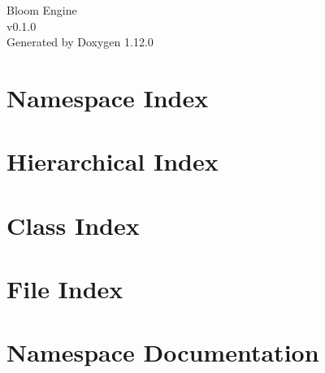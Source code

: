 \documentclass[twoside]{book}
\newcommand{\+}{\discretionary{\mbox{\scriptsize$\hookleftarrow$}}{}{}}
\newcommand{\clearemptydoublepage}{%
    \newpage{\pagestyle{empty}\cleardoublepage}%
  }
\begin{document}
  \raggedbottom
    \hypersetup{pageanchor=false,
                bookmarksnumbered=true,
                pdfencoding=unicode
               }
  \begin{titlepage}
  \vspace*{7cm}
  \begin{center}%
  {\Large Bloom Engine}\\
  [1ex]\large v0.\+1.\+0 \\
  \vspace*{1cm}
  {\large Generated by Doxygen 1.12.0}\\
  \end{center}
  \end{titlepage}
  \clearemptydoublepage
  \tableofcontents
  \clearemptydoublepage
  \hypersetup{pageanchor=true}

\chapter{Namespace Index}

\chapter{Hierarchical Index}

\chapter{Class Index}

\chapter{File Index}

\chapter{Namespace Documentation}


\end{document}
